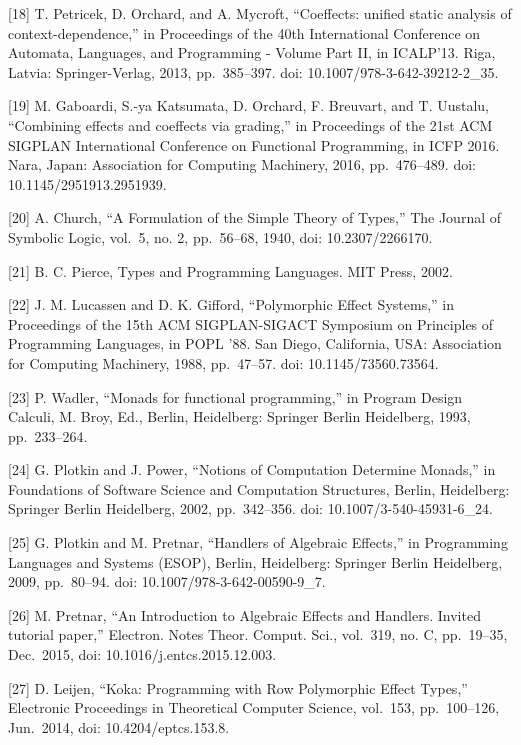 \documentclass[
  10
]{article}
\begin{document}
{[}18{]} T. Petricek, D. Orchard, and A. Mycroft, ``Coeffects: unified static analysis
of context-dependence,'' in Proceedings of the 40th International Conference on
Automata, Languages, and Programming - Volume Part II, in ICALP'13. Riga, Latvia:
Springer-Verlag, 2013, pp.~385--397. doi: 10.1007/978-3-642-39212-2\_35.

{[}19{]} M. Gaboardi, S.-ya Katsumata, D. Orchard, F. Breuvart, and T. Uustalu,
``Combining effects and coeffects via grading,'' in Proceedings of the 21st ACM
SIGPLAN International Conference on Functional Programming, in ICFP 2016. Nara,
Japan: Association for Computing Machinery, 2016, pp.~476--489. doi:
10.1145/2951913.2951939.

{[}20{]} A. Church, ``A Formulation of the Simple Theory of Types,'' The Journal of
Symbolic Logic, vol.~5, no. 2, pp.~56--68, 1940, doi: 10.2307/2266170.

{[}21{]} B. C. Pierce, Types and Programming Languages. MIT Press, 2002.

{[}22{]} J. M. Lucassen and D. K. Gifford, ``Polymorphic Effect Systems,'' in
Proceedings of the 15th ACM SIGPLAN-SIGACT Symposium on Principles of Programming
Languages, in POPL '88. San Diego, California, USA: Association for Computing
Machinery, 1988, pp.~47--57. doi: 10.1145/73560.73564.

{[}23{]} P. Wadler, ``Monads for functional programming,'' in Program Design Calculi,
M. Broy, Ed., Berlin, Heidelberg: Springer Berlin Heidelberg, 1993, pp.~233--264.

{[}24{]} G. Plotkin and J. Power, ``Notions of Computation Determine Monads,'' in
Foundations of Software Science and Computation Structures, Berlin, Heidelberg:
Springer Berlin Heidelberg, 2002, pp.~342--356. doi: 10.1007/3-540-45931-6\_24.

{[}25{]} G. Plotkin and M. Pretnar, ``Handlers of Algebraic Effects,'' in Programming
Languages and Systems (ESOP), Berlin, Heidelberg: Springer Berlin Heidelberg, 2009,
pp.~80--94. doi: 10.1007/978-3-642-00590-9\_7.

{[}26{]} M. Pretnar, ``An Introduction to Algebraic Effects and Handlers. Invited
tutorial paper,'' Electron. Notes Theor. Comput. Sci., vol.~319, no. C, pp.~19--35,
Dec.~2015, doi: 10.1016/j.entcs.2015.12.003.

{[}27{]} D. Leijen, ``Koka: Programming with Row Polymorphic Effect Types,''
Electronic Proceedings in Theoretical Computer Science, vol.~153, pp.~100--126,
Jun.~2014, doi: 10.4204/eptcs.153.8.
\end{document}
